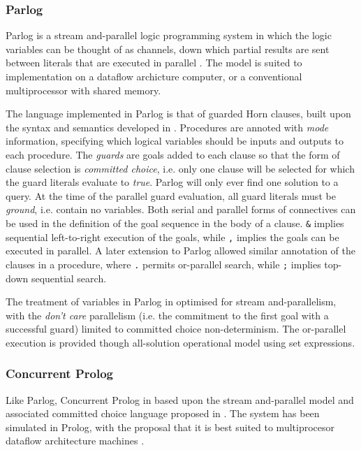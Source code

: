 \subsubsection{Parlog}


Parlog is a stream and-parallel logic programming system in which the logic
variables can be thought of as channels, down which partial results are sent between
literals that are executed in parallel \cite{CG84}.  The model is suited to
implementation on a dataflow archicture computer, or a conventional multiprocessor
with shared memory.

The language implemented in Parlog is that of guarded Horn clauses, built upon the
syntax and semantics developed in \cite{CG81}.  Procedures are annoted with \textit{mode}
information, specifying which logical variables should be inputs and outputs to each
procedure. The \textit{guards} are goals added to each clause so that the form of
clause selection is \textit{committed choice}, i.e. only one clause will be selected for
which the guard literals evaluate to \textit{true}.  Parlog will only ever find one
solution to a query.
At the time of the parallel guard evaluation, all guard literals must be
\textit{ground}, i.e. contain no variables.  Both serial and parallel forms
of connectives can be used in the definition of the goal sequence in the body of 
a clause. \texttt{\&} implies sequential left-to-right execution of the goals, while
\texttt{,} implies the goals can be executed in parallel.  A later extension to
Parlog allowed similar annotation of the clauses in a procedure, where \texttt{.} 
permits or-parallel search, while \texttt{;} implies top-down sequential search.

The treatment of variables in Parlog in optimised for stream and-parallelism, with
the \textit{don't care} parallelism (i.e. the commitment to the first goal with a
successful guard) limited to committed choice non-determinism.  The or-parallel
execution is provided though all-solution operational model using set expressions.

\subsubsection{Concurrent Prolog}


Like Parlog, Concurrent Prolog in based upon the stream and-parallel model and
associated committed choice language proposed in \cite{CG81}.  The system has
been simulated in Prolog, with the proposal that it is best suited to multiprocesor
dataflow architecture machines \cite{Sha87a}.

